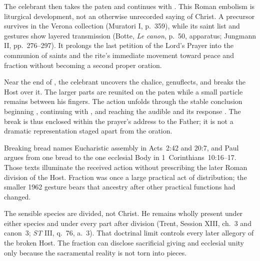 The celebrant then takes the paten and continues with . This Roman embolism is liturgical development, not an otherwise unrecorded saying of Christ. A precursor survives in the Verona collection (Muratori I, p.~359), while its saint list and gestures show layered transmission (Botte, \emph{Le canon}, p.~50, apparatus; Jungmann II, pp.~276--297). It prolongs the last petition of the Lord's Prayer into the communion of saints and the rite's immediate movement toward peace and fraction without becoming a second proper oration.


Near the end of , the celebrant uncovers the chalice, genuflects, and breaks the Host over it. The larger parts are reunited on the paten while a small particle remains between his fingers. The action unfolds through the stable conclusion beginning , continuing with , and reaching the audible  and its response . The break is thus enclosed within the prayer's address to the Father; it is not a dramatic representation staged apart from the oration.

Breaking bread names Eucharistic assembly in Acts~2:42 and 20:7, and Paul argues from one bread to the one ecclesial Body in 1~Corinthians~10:16--17. Those texts illuminate the received action without prescribing the later Roman division of the Host. Fraction was once a large practical act of distribution; the smaller 1962 gesture bears that ancestry after other practical functions had changed.

The sensible species are divided, not Christ. He remains wholly present under either species and under every part after division (Trent, Session XIII, ch.~3 and canon~3; \emph{ST} III, q.~76, a.~3). That doctrinal limit controls every later allegory of the broken Host. The fraction can disclose sacrificial giving and ecclesial unity only because the sacramental reality is not torn into pieces.


